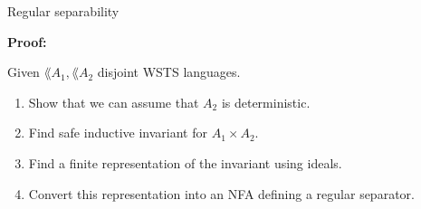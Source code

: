 \documentclass[../talk.tex]{subfiles}
\begin{document}
\begin{frame}{Regular separability}
\begin{overlayarea}{\slidewidth}{\slideheight}
{            %
        }
        {%
            \textbf{Proof:}

            Given $\lang{A_1}, \lang{A_2}$ disjoint WSTS languages.

            \begin{enumerate}
                \item<13-> Show that we can assume \wolog that $A_2$ is \alert{deterministic}.
                \item<14-> Find  \alert{safe inductive invariant} for $A_1 \times A_2$.
                \item<15-> Find a \alert{finite representation} of the invariant using \alert{ideals}.
                \item<16-> Convert this representation into an NFA defining a regular separator.
            \end{enumerate}
        }
    \end{overlayarea}
\end{frame}
\end{document}
